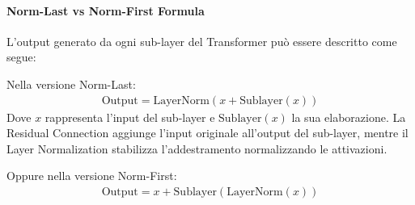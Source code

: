 \paragraph{Norm-Last vs Norm-First Formula}
L'output generato da ogni sub-layer del Transformer può essere descritto come segue:

Nella versione Norm-Last:
\begin{align}
	\text{Output} = \text{LayerNorm}(x + \text{Sublayer}(x))
\end{align}
Dove \(x\) rappresenta l'input del sub-layer e \(\text{Sublayer}(x)\) la sua elaborazione. La Residual Connection aggiunge l'input originale all'output del sub-layer, mentre il Layer Normalization stabilizza l'addestramento normalizzando le attivazioni.

Oppure nella versione Norm-First:
\begin{align}
	\text{Output} = x + \text{Sublayer}(\text{LayerNorm}(x))
\end{align}

